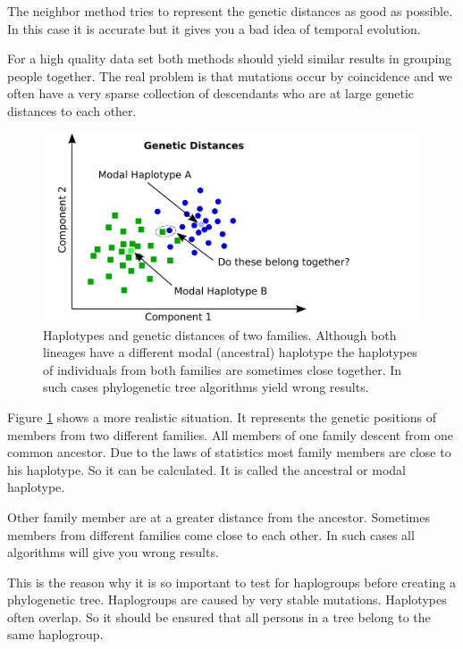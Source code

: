 The neighbor method tries to represent the genetic distances
as good as possible. In this case it is accurate but it gives
you a bad idea of temporal evolution.

For a high quality data set both methods should yield similar
results in grouping people together. The real problem is that
mutations occur by coincidence and we often have a very sparse
collection of descendants who are at large genetic distances
to each other.

\begin{figure}[ht]
\centering
\includegraphics[width=13cm]{img/distances.png}
\caption{\label{distances} Haplotypes and genetic distances
of two families. Although both lineages have a different modal
(ancestral) haplotype the haplotypes of individuals from
both families are sometimes close together. In such cases
phylogenetic tree algorithms yield wrong results.}
\end{figure}

Figure \ref{distances} shows a more realistic situation.
It represents the genetic positions of members from two
different families. All members of one family descent from
one common ancestor. Due to the laws of statistics most
family members are close to his haplotype. So it can be
calculated. It is called the ancestral or modal haplotype.

Other family member are at a greater distance from the
ancestor. Sometimes members from different families come
close to each other. In such cases all algorithms will 
give you wrong results.

This is the reason why it is so important to test for
haplogroups before creating a phylogenetic tree. Haplogroups
are caused by very stable mutations. Haplotypes often overlap.
So it should be ensured that all persons in a tree belong
to the same haplogroup.




















